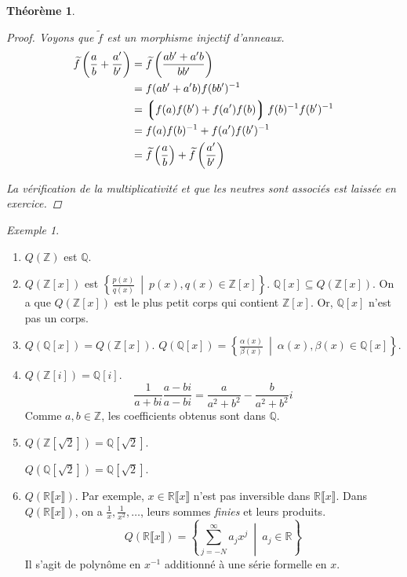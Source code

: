\documentclass{report}
\newtheorem*{thm}{Th\'eor\`eme}
\theoremstyle{definition}
\theoremstyle{remark}
\newtheorem*{exem}{Exemple}
\def\ZZ{\mathbb{Z}}
\def\QQ{\mathbb{Q}}
\def\RR{\mathbb{R}}
\begin{document}
\begin{thm}
\begin{proof}
			Voyons que $\widetilde{f}$ est un morphisme injectif d'anneaux.
			\begin{align*}
				\widetilde{f}\left(\frac{a}{b}+\frac{a'}{b'}\right)&= \widetilde{f}\left(\frac{ab'+a'b}{bb'}\right)\\
				&= f(ab'+a'b)f(bb')^{-1}\\
				&= \left\lgroup f(a)f(b')+f(a')f(b) \right\rgroup f(b)^{-1} f(b')^{-1}\\
				&= f(a)f(b)^{-1} + f(a')f(b')^{-1}\\
				&= \widetilde{f}\left(\frac{a}{b}\right) + \widetilde{f}\left(\frac{a'}{b'}\right)
			\end{align*}

			La v\'erification de la multiplicativit\'e et que les neutres sont associ\'es est laiss\'ee en exercice.
		\end{proof}
	\end{thm}

	\begin{exem}
		\begin{enumerate}
			\item $Q(\ZZ)$ est $\QQ$.
			\item $Q(\ZZ[x])$ est $\left\{ \frac{p(x)}{q(x)} ~\middle|~ p(x),q(x) \in \ZZ[x] \right\}$. $\QQ[x]\subseteq Q(\ZZ[x])$. On a que $Q(\ZZ[x])$ est le plus petit corps qui contient $\ZZ[x]$. Or, $\QQ[x]$ n'est pas un corps.
			\item $Q(\QQ[x]) = Q(\ZZ[x])$. $Q(\QQ[x]) = \left\{ \frac{\alpha(x)}{\beta(x)} ~\middle|~ \alpha(x),\beta(x)\in\QQ[x] \right\}$.
			\item $Q(\ZZ[i])=\QQ[i]$. \[ \frac{1}{a+bi} \frac{a-bi}{a-bi} = \frac{a}{a^2+b^2}-\frac{b}{a^2+b^2}i \] Comme $a,b\in\ZZ$, les coefficients obtenus sont dans $\QQ$.
			\item $Q(\ZZ[\sqrt{2}])=\QQ[\sqrt{2}]$.

			$Q(\QQ[\sqrt{2}])=\QQ[\sqrt{2}]$.
			\item $Q(\RR\llbracket x \rrbracket)$. Par exemple, $x\in\RR\llbracket x\rrbracket$ n'est pas inversible dans $\RR\llbracket x\rrbracket$. Dans $Q(\RR\llbracket x\rrbracket)$, on a $\frac{1}{x}, \frac{1}{x^2}, \dots$, leurs sommes \emph{finies} et leurs produits.
			\[ Q(\RR\llbracket x\rrbracket) = \left\{ \sum_{j=-N}^{\infty} a_jx^j ~\middle|~ a_j\in\RR \right\} \]
			Il s'agit de polyn\^ome en $x^{-1}$ additionn\'e \`a une s\'erie formelle en $x$.
		\end{enumerate}
	\end{exem}
\end{document}
